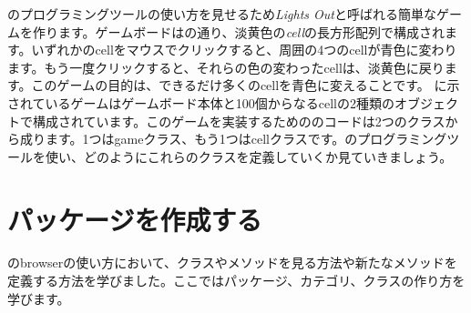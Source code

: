 \documentclass[a4paper,10pt,twoside]{book}
\begin{document}
\pharo{}のプログラミングツールの使い方を見せるため\emph{Lights Out}と呼ばれる簡単なゲームを作ります。ゲームボードはの通り、淡黄色の\emph{cell}の長方形配列で構成されます。いずれかのcellをマウスでクリックすると、周囲の4つのcellが青色に変わります。もう一度クリックすると、それらの色の変わったcellは、淡黄色に戻ります。このゲームの目的は、できるだけ多くのcellを青色に変えることです。
に示されているゲームはゲームボード本体と100個からなるcellの2種類のオブジェクトで構成されています。このゲームを実装するための\pharo{}のコードは2つのクラスから成ります。1つはgameクラス、もう1つはcellクラスです。\pharo{}のプログラミングツールを使い、どのようにこれらのクラスを定義していくか見ていきましょう。

\section{パッケージを作成する}

のbrowserの使い方において、クラスやメソッドを見る方法や新たなメソッドを定義する方法を学びました。ここではパッケージ、カテゴリ、クラスの作り方を学びます。

\end{document}

